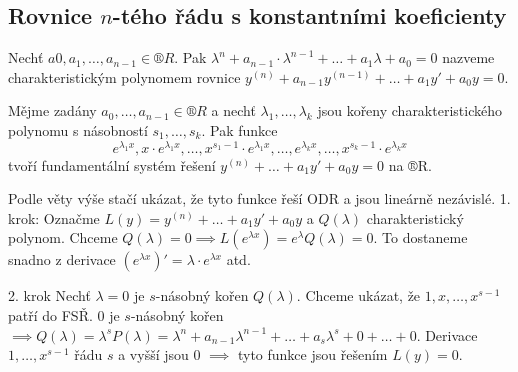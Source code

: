 \documentclass[12pt]{article}                   %
\begin{document}
    \subsection{Rovnice $n$-tého řádu s konstantními koeficienty}
        \begin{definice}
            Nechť $a0, a_1, …, a_{n-1} \in ®R$. Pak $\lambda^n + a_{n-1}·\lambda^{n-1} + … + a_1\lambda + a_0 = 0$ nazveme charakteristickým polynomem rovnice $y^{(n)} + a_{n-1}y^{(n-1)} + … + a_1y' + a_0y = 0$.
        \end{definice}

        \begin{veta}
            Mějme zadány $a_0, …, a_{n-1} \in ®R$ a nechť $\lambda_1, …, \lambda_k$ jsou kořeny charakteristického polynomu s násobností $s_1, …, s_k$. Pak funkce
            $$ e^{\lambda_1 x}, x·e^{\lambda_1 x}, …, x^{s_1 - 1}·e^{\lambda_1 x}, …, e^{\lambda_k x}, …, x^{s_{k} - 1}·e^{\lambda_k x} $$ 
            tvoří fundamentální systém řešení $y^{(n)} + … + a_1y' + a_0y = 0$ na ®R.

            \begin{dukazin}
                Podle věty výše stačí ukázat, že tyto funkce řeší ODR a jsou lineárně nezávislé. 1. krok: Označme $L(y) = y^{(n)} + … + a_1y' + a_0y$ a $Q(\lambda)$ charakteristický polynom. Chceme $Q(\lambda) = 0 \implies L(e^{\lambda x}) = e^{\lambda} Q(\lambda) = 0$. To dostaneme snadno z derivace $(e^{\lambda x})' = \lambda·e^{\lambda x}$ atd.

                2. krok Nechť $\lambda = 0$ je $s$-násobný kořen $Q(\lambda)$. Chceme ukázat, že $1, x, …, x^{s-1}$ patří do FSŘ. $0$ je $s$-násobný kořen $\implies Q(\lambda) = \lambda^sP(\lambda) = \lambda^n + a_{n-1}\lambda^{n-1} + … + a_s\lambda^s + 0 + … + 0$. Derivace $1, …, x^{s-1}$ řádu $s$ a vyšší jsou $0$ $\implies$ tyto funkce jsou řešením $L(y) = 0$.



            \end{dukazin}
        \end{veta}
\end{document}
